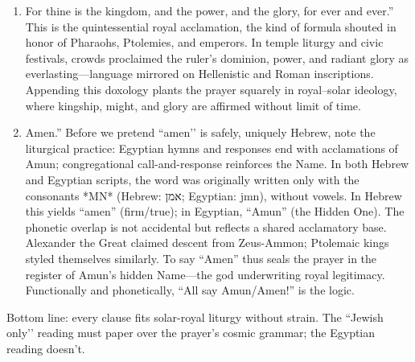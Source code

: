 \begin{enumerate}
    \item
    For thine is the kingdom, and the power, and the glory, for ever and ever.'' This is the quintessential royal acclamation, the kind of formula shouted in honor of Pharaohs, Ptolemies, and emperors. In temple liturgy and civic festivals, crowds proclaimed the ruler’s dominion, power, and radiant glory as everlasting—language mirrored on Hellenistic and Roman inscriptions. Appending this doxology plants the prayer squarely in royal–solar ideology, where kingship, might, and glory are affirmed without limit of time.
    \item
    Amen.'' Before we pretend ``amen’’ is safely, uniquely Hebrew, note the liturgical practice: Egyptian hymns and responses end with acclamations of Amun; congregational call-and-response reinforces the Name. In both Hebrew and Egyptian scripts, the word was originally written only with the consonants *MN* (Hebrew: אמן; Egyptian: jmn), without vowels. In Hebrew this yields “amen” (firm/true); in Egyptian, “Amun” (the Hidden One). The phonetic overlap is not accidental but reflects a shared acclamatory base. Alexander the Great claimed descent from Zeus-Ammon; Ptolemaic kings styled themselves similarly. To say “Amen” thus seals the prayer in the register of Amun’s hidden Name—the god underwriting royal legitimacy. Functionally and phonetically, “All say Amun/Amen!” is the logic.
\end{enumerate}

Bottom line: every clause fits solar-royal liturgy without strain.
The ``Jewish only’’ reading must paper over the prayer’s cosmic grammar; the Egyptian reading doesn’t.

